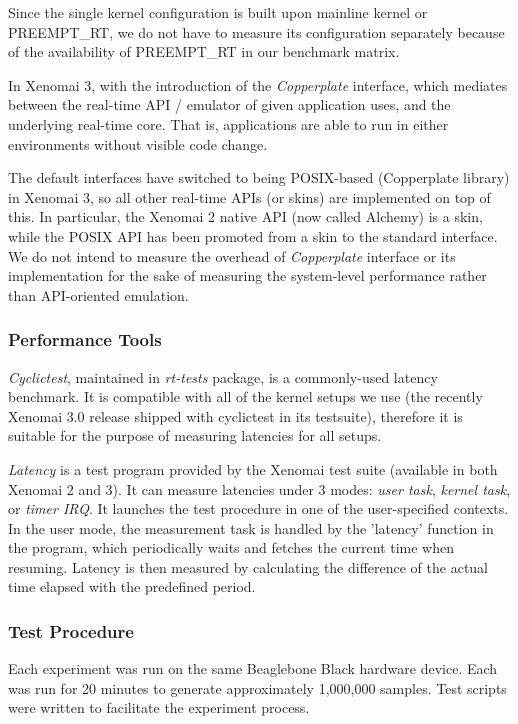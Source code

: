 \documentclass[10pt,a4paper]{article}
\begin{document}
\begin{multicols}{2}
Since the single kernel configuration is built upon mainline kernel or PREEMPT\_RT, we do not have to measure its configuration separately because of the availability of PREEMPT\_RT in our benchmark matrix.

In Xenomai 3, with the introduction of the \textit{Copperplate} interface, which mediates between the real-time API / emulator of given application uses, and the underlying real-time core. That is, applications are able to run in either environments without visible code change. 

The default interfaces have switched to being POSIX-based (Copperplate library) in Xenomai 3, so all other real-time APIs (or skins) are implemented on top of this. In particular, the Xenomai 2 native API (now called Alchemy) is a skin, while the POSIX API has been promoted from a skin to the standard interface. We do not intend to measure the overhead of \textit{Copperplate} interface or its implementation for the sake of measuring the system-level performance rather than API-oriented emulation.

\subsubsection{Performance Tools}
\textit{Cyclictest}, maintained in \textit{rt-tests} \cite{rt-tests} package, is a commonly-used latency benchmark. It is compatible with all of the kernel setups we use (the recently Xenomai 3.0 release shipped with cyclictest in its testsuite), therefore it is suitable for the purpose of measuring latencies for all setups.

\textit{Latency} is a test program provided by the Xenomai test suite (available in both Xenomai 2 and 3). It can measure latencies under 3 modes: \textit{user task}, \textit{kernel task}, or \textit{timer IRQ}. It launches the test procedure in one of the user-specified contexts. In the user mode, the measurement task is handled by the 'latency' function in the program, which periodically waits and fetches the current time when resuming. Latency is then measured by calculating the difference of the actual time elapsed with the predefined period.

\subsubsection{Test Procedure}
Each experiment was run on the same Beaglebone Black hardware device. Each was run for 20 minutes to generate approximately 1,000,000 samples. Test scripts were written to facilitate the experiment process.


\end{multicols}
\end{document}

